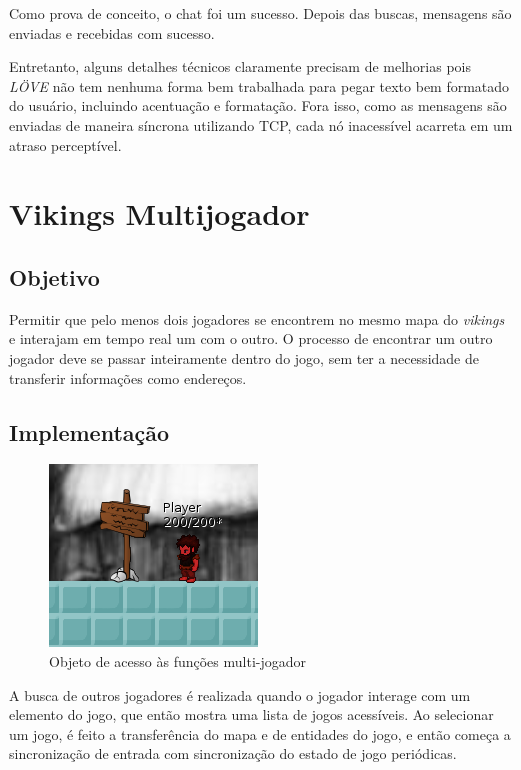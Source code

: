     Como prova de conceito, o chat foi um sucesso. Depois das buscas, mensagens são enviadas
    e recebidas com sucesso.
    
    Entretanto, alguns detalhes técnicos claramente precisam de melhorias pois \textit{LÖVE} não
    tem nenhuma forma bem trabalhada para pegar texto bem formatado do usuário, incluindo
    acentuação e formatação. Fora isso, como as mensagens são enviadas de maneira síncrona
    utilizando TCP, cada nó inacessível acarreta em um atraso perceptível.
    
\section{Vikings Multijogador}
\label{sec:experimentos:vikings}

  \subsection{Objetivo}
    Permitir que pelo menos dois jogadores se encontrem no mesmo mapa do \textit{vikings} e
    interajam em tempo real um com o outro. O processo de encontrar um outro jogador deve se
    passar inteiramente dentro do jogo, sem ter a necessidade de transferir informações como
    endereços.
    
  \subsection{Implementação}
    \begin{figure}[h]
      \centering
      \includegraphics{imagens/vikings-signpost.png}
      \caption{Objeto de acesso às funções multi-jogador}
    \end{figure}
    
    A busca de outros jogadores é realizada quando o jogador interage com um elemento do jogo,
    que então mostra uma lista de jogos acessíveis. Ao selecionar um jogo, é feito a transferência
    do mapa e de entidades do jogo, e então começa a sincronização de entrada com sincronização
    do estado de jogo periódicas.
    
